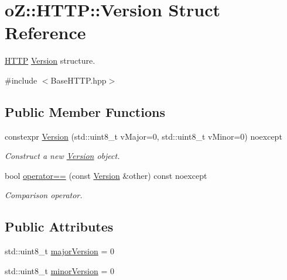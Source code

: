 \hypertarget{structo_z_1_1_h_t_t_p_1_1_version}{}\section{oZ\+::H\+T\+TP\+::Version Struct Reference}
\label{structo_z_1_1_h_t_t_p_1_1_version}


\mbox{\hyperlink{namespaceo_z_1_1_h_t_t_p}{H\+T\+TP}} \mbox{\hyperlink{structo_z_1_1_h_t_t_p_1_1_version}{Version}} structure.  




{\ttfamily \#include $<$Base\+H\+T\+T\+P.\+hpp$>$}

\subsection*{Public Member Functions}
\begin{DoxyCompactItemize}
\item 
constexpr \mbox{\hyperlink{structo_z_1_1_h_t_t_p_1_1_version_a56b4ae16656db97e48feea33da112d65}{Version}} (std\+::uint8\+\_\+t v\+Major=0, std\+::uint8\+\_\+t v\+Minor=0) noexcept
\begin{DoxyCompactList}\small\item\em Construct a new \mbox{\hyperlink{structo_z_1_1_h_t_t_p_1_1_version}{Version}} object. \end{DoxyCompactList}\item 
bool \mbox{\hyperlink{structo_z_1_1_h_t_t_p_1_1_version_a6d985577db3b920c4efa2a03c46b827b}{operator==}} (const \mbox{\hyperlink{structo_z_1_1_h_t_t_p_1_1_version}{Version}} \&other) const noexcept
\begin{DoxyCompactList}\small\item\em Comparison operator. \end{DoxyCompactList}\end{DoxyCompactItemize}
\subsection*{Public Attributes}
\begin{DoxyCompactItemize}
\item 
std\+::uint8\+\_\+t \mbox{\hyperlink{structo_z_1_1_h_t_t_p_1_1_version_a451d759d7fcdcef197c21140b1e9527e}{major\+Version}} = 0
\item 
std\+::uint8\+\_\+t \mbox{\hyperlink{structo_z_1_1_h_t_t_p_1_1_version_a13e3758802c2b9b974f56d1ea25fafad}{minor\+Version}} = 0
\end{DoxyCompactItemize}


